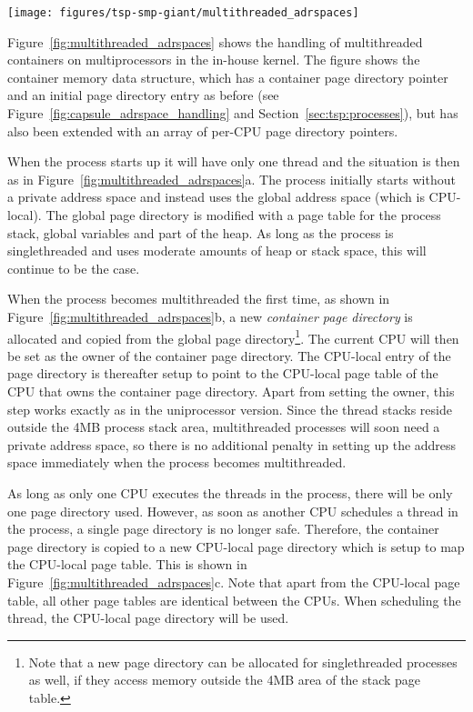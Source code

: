\begin{figure*}[thb]
  \centering
  \texttt{[image: figures/tsp-smp-giant/multithreaded\_adrspaces]}
  \caption[Multiprocessor container address space handling]{Handling of container address spaces in the in-house kernel for
    multiprocessor computers}
  \label{fig:multithreaded_adrspaces}
\end{figure*}

Figure~\ref{fig:multithreaded_adrspaces} shows the handling of multithreaded
containers on multiprocessors in the in-house kernel. The figure shows the
container memory data structure, which has a container page directory pointer
and an initial page directory entry as before (see
Figure~\ref{fig:capsule_adrspace_handling} and
Section~\ref{sec:tsp:processes}), but has also been extended with an array of
per-CPU page directory pointers.

When the process starts up it will have only one thread and the situation is
then as in Figure~\ref{fig:multithreaded_adrspaces}a. The process initially
starts without a private address space and instead uses the global address
space (which is CPU-local). The global page directory is modified with a page
table for the process stack, global variables and part of the heap. As long as
the process is singlethreaded and uses moderate amounts of heap or stack
space, this will continue to be the case.

When the process becomes multithreaded the first time, as shown in
Figure~\ref{fig:multithreaded_adrspaces}b, a new \emph{container page
  directory} is allocated and copied from the global page
directory\footnote{Note that a new page directory can be allocated for
  singlethreaded processes as well, if they access memory outside the 4MB area
  of the stack page table.}.  The current CPU will then be set as the owner of
the container page directory.  The CPU-local entry of the page directory is
thereafter setup to point to the CPU-local page table of the CPU that owns the
container page directory.  Apart from setting the owner, this step works
exactly as in the uniprocessor version. Since the thread stacks reside outside
the 4MB process stack area, multithreaded processes will soon need a private
address space, so there is no additional penalty in setting up the address
space immediately when the process becomes multithreaded.

As long as only one CPU executes the threads in the process, there will be
only one page directory used. However, as soon as another CPU schedules a
thread in the process, a single page directory is no longer safe. Therefore,
the container page directory is copied to a new CPU-local page directory which
is setup to map the CPU-local page table. This is shown in
Figure~\ref{fig:multithreaded_adrspaces}c. Note that apart from the CPU-local
page table, all other page tables are identical between the CPUs. When
scheduling the thread, the CPU-local page directory will be used.


